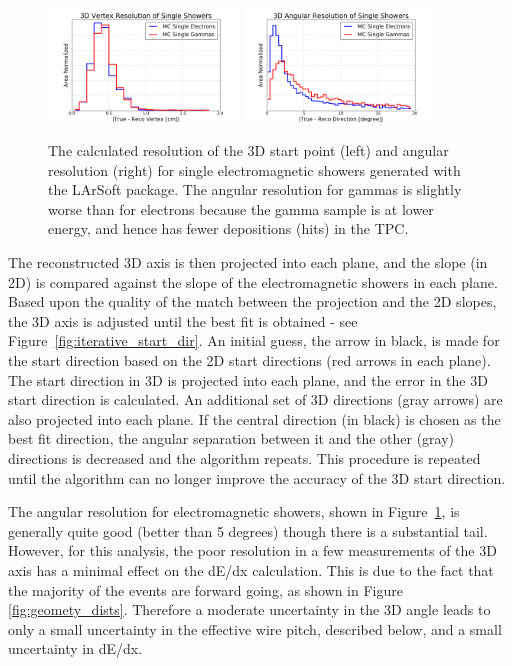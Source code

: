 \begin{figure}[htbp]
   
   \includegraphics[width=0.45\textwidth]{emshower_figures/3d_resolution.png}
   \includegraphics[width=0.45\textwidth]{emshower_figures/AngularResolution.png}
   \caption[Resolution of Electromagnetic Showers]{The calculated resolution of the 3D start point (left) and angular resolution (right) for single electromagnetic showers generated with the LArSoft package.  The angular resolution for gammas is slightly worse than for electrons because the gamma sample is at lower energy, and hence has fewer depositions (hits) in the TPC.}
   \label{fig:shower_reco}
 \end{figure} 


The reconstructed 3D axis is then projected into each plane, and the slope (in 2D) is compared against the slope of the electromagnetic showers in each plane.  Based upon the quality of the match between the projection and the 2D slopes, the 3D axis is adjusted until the best fit is obtained - see Figure~\ref{fig:iterative_start_dir}.  An initial guess, the arrow in black, is made for the start direction based on the 2D start directions (red arrows in each plane).  The start direction in 3D is projected into each plane, and the error in the 3D start direction is calculated.  An additional set of 3D directions (gray arrows) are also projected into each plane.  If the central direction (in black) is chosen as the best fit direction, the angular separation between it and the other (gray) directions is decreased and the algorithm repeats.  This procedure is repeated until the algorithm can no longer improve the accuracy of the 3D start direction.

The angular resolution for electromagnetic showers, shown in Figure~\ref{fig:shower_reco}, is generally quite good (better than 5 degrees) though there is a substantial tail.  However, for this analysis, the poor resolution in a few measurements of the 3D axis has a minimal effect on the dE/dx calculation.  This is due to the fact that the majority of the events are forward going, as shown in Figure \ref{fig:geomety_dists}.  Therefore a moderate uncertainty in the 3D angle leads to only a small uncertainty in the effective wire pitch, described below, and a small uncertainty in dE/dx.

